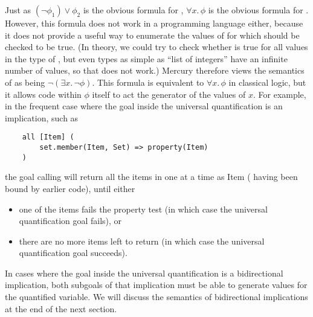 Just as $(\lnot \phi_1) \lor \phi_2$ is the obvious formula
for ,
$\forall x.\, \phi$ is the obvious formula for .
However, this formula does not work in a programming language either,
because it does not provide a useful way
to enumerate the values of 
for which  should be checked to be true.
(In theory, we could try to check whether
 is true for all values in the type of ,
but even types as simple as ``list of integers''
have an infinite number of values,
so that does not work.)
Mercury therefore views the semantics of 
as being $\lnot (\exists x.\, \lnot \phi)$.
This formula is equivalent to $\forall x.\, \phi$ in classical logic,
but it allows code within $\phi$ itself
to act the generator of the values of $x$.
For example, in the frequent case
where the goal inside the universal quantification is an implication,
such as
\begin{verbatim}
    all [Item] (
        set.member(Item, Set) => property(Item)
    )
\end{verbatim}
the goal calling 
will return all the items in  one at a time as Item
( having been bound by earlier code),
until either
\begin{itemize}
\item
one of the items fails the property test
(in which case the universal quantification goal fails), or
\item
there are no more items left to return
(in which case the universal quantification goal succeeds).
\end{itemize}

In cases where the goal inside the universal quantification
is a bidirectional implication,
both subgoals of that implication
must be able to generate values for the quantified variable.
We will discuss the semantics of bidirectional implications
at the end of the next section.





